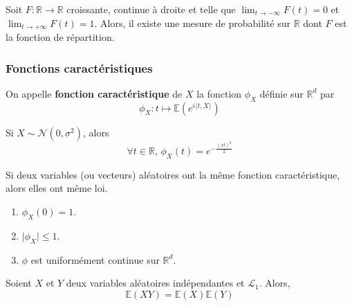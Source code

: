   \begin{theorem}
    Soit $F : \mathbb{R} \rightarrow \mathbb{R}$ croissante, continue à droite et telle que $\lim_{t \rightarrow -\infty} F(t) = 0$ et $\lim_{t \rightarrow +\infty} F(t) = 1$. Alors, il existe une mesure de probabilité sur $\mathbb{R}$ dont $F$ est la fonction de répartition.
  \end{theorem}

  \subsubsection{Fonctions caractéristiques}


  \begin{definition}
    On appelle \textbf{fonction caractéristique} de $X$ la fonction $\phi_X$ définie sur $\mathbb{R}^d$ par
    \[ \phi_X : t \mapsto \mathbb{E}\left( e^{i \langle t, X \rangle} \right) \]
  \end{definition}


  \begin{example}
    Si $X \sim \mathcal{N}(0, \sigma^2)$, alors
    \[ \forall t \in \mathbb{R}, \, \phi_X(t) = e^{-\frac{(xt)^2}{2}} \]
  \end{example}


  \begin{theorem}
    Si deux variables (ou vecteurs) aléatoires ont la même fonction caractéristique, alors elles ont même loi.
  \end{theorem}

  \begin{theorem}
    \begin{enumerate}[label=(\roman*)]
      \item $\phi_X(0) = 1$.
      \item $\vert \phi_X \vert \leq 1$.
      \item $\phi$ est uniformément continue sur $\mathbb{R}^d$.
    \end{enumerate}
  \end{theorem}
  
  \begin{theorem}
    Soient $X$ et $Y$ deux variables aléatoires indépendantes et $\mathcal{L}_1$. Alors,
    \[ \mathbb{E}(X Y) = \mathbb{E}(X) \mathbb{E}(Y) \]
  \end{theorem}

